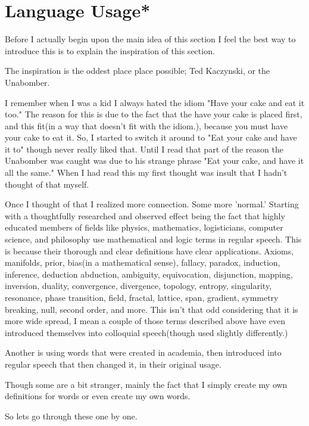 \section{Language Usage*}
\par Before I actually begin upon the main idea of this section I feel the best way to introduce this is to explain the inspiration of this section.
\par The inspiration is the oddest place place possible; Ted Kaczynski, or the Unabomber.
\par I remember when I was a kid I always hated the idiom "Have your cake and eat it too." The reason for this is due to the fact that the have your cake is placed first, and this fit(in a way that doesn't fit with the idiom.), because you must have your cake to eat it. So, I started to switch it around to "Eat your cake and have it to" though never really liked that. Until I read that part of the reason the Unabomber was caught was due to his strange phrase "Eat your cake, and have it all the same." When I had read this my first thought was insult that I hadn't thought of that myself.
\par Once I thought of that I realized more connection. Some more 'normal.' Starting with a thoughtfully researched and observed effect being the fact that highly educated members of fields like physics, mathematics, logisticians, computer science, and philosophy use mathematical and logic terms in regular speech. This is because their thorough and clear definitions have clear applications. Axioms, manifolds, prior, bias(in a mathematical sense), fallacy, paradox, induction, inference, deduction abduction, ambiguity, equivocation, disjunction, mapping, inversion, duality, convergence, divergence, topology, entropy, singularity, resonance, phase transition, field, fractal, lattice, span, gradient, symmetry breaking, null, second order, and more. This isn't that odd considering that it is more wide spread, I mean a couple of those terms described above have even introduced themselves into colloquial speech(though used slightly differently.)
\par Another is using words that were created in academia, then introduced into regular speech that then changed it, in their original usage.
\par Though some are a bit stranger, mainly the fact that I simply create my own definitions for words or even create my own words.
\\
\par So lets go through these one by one.
